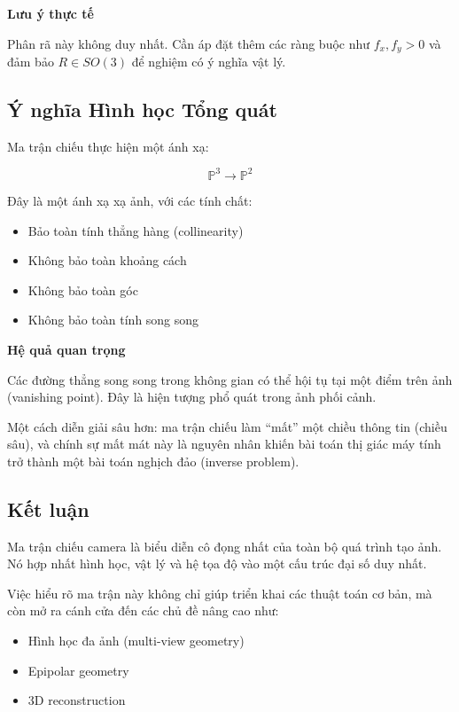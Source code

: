 \begin{mdframed}[style=infobox]
	\textbf{Lưu ý thực tế}
	
	Phân rã này không duy nhất. Cần áp đặt thêm các ràng buộc như $f_x, f_y > 0$ và đảm bảo $R \in SO(3)$ để nghiệm có ý nghĩa vật lý.
\end{mdframed}

\subsection{Ý nghĩa Hình học Tổng quát}
\label{subsec:projection_geometry}

Ma trận chiếu thực hiện một ánh xạ:

\[
\mathbb{P}^3 \rightarrow \mathbb{P}^2
\]

Đây là một ánh xạ xạ ảnh, với các tính chất:

\begin{itemize}
	\item Bảo toàn tính thẳng hàng (collinearity)
	\item Không bảo toàn khoảng cách
	\item Không bảo toàn góc
	\item Không bảo toàn tính song song
\end{itemize}

\begin{mdframed}[style=infobox]
	\textbf{Hệ quả quan trọng}
	
	Các đường thẳng song song trong không gian có thể hội tụ tại một điểm trên ảnh (vanishing point). Đây là hiện tượng phổ quát trong ảnh phối cảnh.
\end{mdframed}

Một cách diễn giải sâu hơn: ma trận chiếu làm “mất” một chiều thông tin (chiều sâu), và chính sự mất mát này là nguyên nhân khiến bài toán thị giác máy tính trở thành một bài toán nghịch đảo (inverse problem).

\subsection{Kết luận}
\label{subsec:projection_conclusion}

Ma trận chiếu camera là biểu diễn cô đọng nhất của toàn bộ quá trình tạo ảnh. Nó hợp nhất hình học, vật lý và hệ tọa độ vào một cấu trúc đại số duy nhất.

Việc hiểu rõ ma trận này không chỉ giúp triển khai các thuật toán cơ bản, mà còn mở ra cánh cửa đến các chủ đề nâng cao như:
\begin{itemize}
	\item Hình học đa ảnh (multi-view geometry)
	\item Epipolar geometry
	\item 3D reconstruction
\end{itemize}

